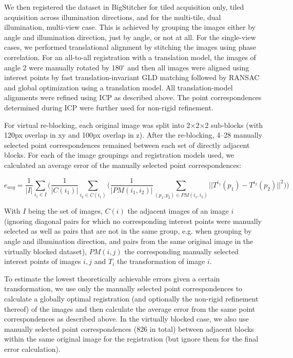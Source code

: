 We then registered the dataset in BigStitcher for tiled acquisition only, tiled acquisition across illumination directions, and for the multi-tile, dual illumination, multi-view case. This is achieved by grouping the images either by angle and illumination direction, just by angle, or not at all. 
For the single-view cases, we performed translational alignment by stitching the images using phase correlation. For an all-to-all registration with a translation model, the images of angle 2 were manually rotated by 180${}^\circ$ and then all images were aligned using interest points by fast translation-invariant GLD matching followed by RANSAC\cite{ransac} and global optimization using a translation model. All translation-model alignments were refined using ICP\cite{icp} as described above. The point correspondences determined during ICP were further used for non-rigid refinement.

For virtual re-blocking, each original image was split into 2$\times$2$\times$2 sub-blocks (with 120px overlap in xy and 100px overlap in z). After the re-blocking, 4--28 manually selected point correspondences remained between each set of directly adjacent blocks. For each of the image groupings and registration models used, we calculated an average error of the manually selected point correspondences:

\begin{equation}
\label{eq:regQuality}
e_{avg} = \frac{1}{|I|} \sum_{i_1 \in I} \bigg( \frac{1}{|C(i_1)|} \sum_{i_2 \in C(i_1)} \Big( \frac{1}{|PM(i_1, i_2)|} \sum_{(p_1, p_2) \in PM(i_1, i_2)} || T^{i_1}(p_1) - T^{i_2}(p_2) ||^2 \Big) \bigg)    
\end{equation}

With $I$ being the set of images, $C(i)$ the adjacent images of an image $i$ (ignoring diagonal pairs for which no corresponding interest points were manually selected as well as pairs that are not in the same group, e.g. when grouping by angle and illumination direction, and pairs from the same original image in the virtually blocked dataset), $PM(i,j)$ the corresponding manually selected interest points of images $i,j$ and $T_i$ the transformation of image $i$.

To estimate the lowest theoretically achievable errors given a certain transformation, we use only the manually selected point correspondences to calculate a globally optimal registration (and optionally the non-rigid refinement thereof) of the images and then calculate the average error from the same point correspondences as described above. In the virtually blocked case, we also use manually selected point correspondences (826 in total) between adjacent blocks within the same original image for the registration (but ignore them for the final error calculation). 

